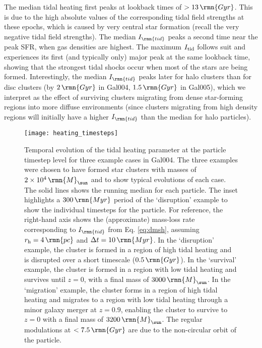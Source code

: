 \documentclass[fleqn,usenatbib]{mnras}
\newcommand\Msun{\,\rmn{M}_{\sun}}
\newcommand\Gyr{\,\rmn{Gyr}}
\newcommand\Myr{\,\rmn{Myr}}
\newcommand\pc{\,\rmn{pc}}
\begin{document}
The median tidal heating first peaks at lookback times of $>13 \Gyr$. This is due to the high absolute values of the corresponding tidal field strengths at these epochs, which is caused by very central star formation (recall the very negative tidal field strengths).
The median $I_\rmn{tid}$ peaks a second time near the peak SFR, when gas densities are highest. The maximum $I_{\rm tid}$ follows suit and experiences its first (and typically only) major peak at the same lookback time, showing that the strongest tidal shocks occur when most of the stars are being formed. Interestingly, the median $I_\rmn{tid}$ peaks later for halo clusters than for disc clusters (by $2 \Gyr$ in Gal004, $1.5 \Gyr$ in Gal005), which we interpret as the effect of surviving clusters migrating from dense star-forming regions into more diffuse environments (since clusters migrating from high density regions will initially have a higher $I_\rmn{tid}$ than the median for halo particles).

\begin{figure*}
  \texttt{[image: heating\_timesteps]}
  \caption{ Temporal evolution of the tidal heating parameter at the particle timestep level for three example cases in Gal004. The three examples were chosen to have formed star clusters with masses of $2\times10^4 \Msun$ and to show typical evolutions of each case. The solid lines shows the running median for each particle. The inset highlights a $300 \Myr$ period of the `disruption' example to show the individual timesteps for the particle. For reference, the right-hand axis shows the (approximate) mass-loss rate corresponding to $I_\rmn{tid}$ from Eq. \ref{eq:dmsh}, assuming $r_{\rm h} = 4 \pc$ and $\Delta t = 10 \Myr$. In the `disruption' example, the cluster is formed in a region of high tidal heating and is disrupted over a short timescale ($0.5 \Gyr$). In the `survival' example, the cluster is formed in a region with low tidal heating and survives until $z=0$, with a final mass of $3000 \Msun$. In the `migration' example, the cluster forms in a region of high tidal heating and migrates to a region with low tidal heating through a minor galaxy merger at $z=0.9$, enabling the cluster to survive to $z=0$ with a final mass of $3200 \Msun$. The regular modulations at $<7.5 \Gyr$ are due to the non-circular orbit of the particle.}
  \label{fig:heating_ts}
\end{figure*}
\end{document}
